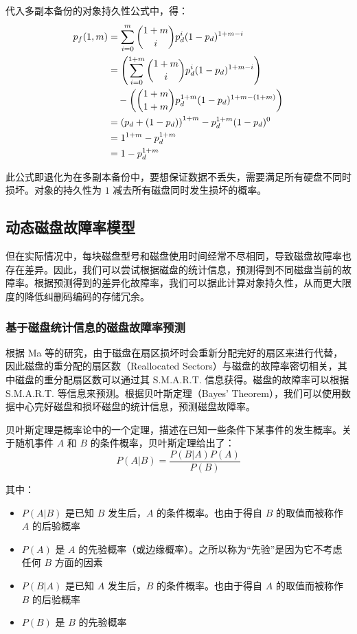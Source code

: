 代入多副本备份的对象持久性公式中，得：
\begin{equation}
\begin{split}
p_{f}(1,m)&=\sum_{i=0}^{m}{\dbinom{1+m}{i}p_{d}^{i}(1-p_d)^{1+m-i}}\\
&=\left(\sum_{i=0}^{1+m}{\dbinom{1+m}{i}p_{d}^{i}(1-p_d)^{1+m-i}}\right)\\
&\quad-\left(\dbinom{1+m}{1+m}p_{d}^{1+m}(1-p_d)^{1+m-(1+m)}\right)\\
&=\left(p_d+(1-p_d)\right)^{1+m}-p_{d}^{1+m}(1-p_d)^{0}\\
&=1^{1+m}-p_{d}^{1+m}\\
&=1-p_{d}^{1+m}
\end{split}
\end{equation}

此公式即退化为在多副本备份中，要想保证数据不丢失，需要满足所有硬盘不同时损坏。对象的持久性为 $1$ 减去所有磁盘同时发生损坏的概率。
\subsection{动态磁盘故障率模型}
但在实际情况中，每块磁盘型号和磁盘使用时间经常不尽相同，导致磁盘故障率也存在差异。因此，我们可以尝试根据磁盘的统计信息，预测得到不同磁盘当前的故障率。根据预测得到的差异化故障率，我们可以据此计算对象持久性，从而更大限度的降低纠删码编码的存储冗余。
\subsubsection{基于磁盘统计信息的磁盘故障率预测}
根据 Ma 等\cite{ma2015raidshield}的研究，由于磁盘在扇区损坏时会重新分配完好的扇区来进行代替，因此磁盘的重分配的扇区数（Reallocated Sectors）与磁盘的故障率密切相关，其中磁盘的重分配扇区数可以通过其 S.M.A.R.T. 信息\cite{allen2004monitoring}获得。磁盘的故障率可以根据 S.M.A.R.T. 等信息来预测\cite{xu2018improving,mahdisoltani2017proactive,lu2020making,dos2017predicting,chaves2018hard,botezatu2016predicting,anantharaman2018large}。根据贝叶斯定理（Bayes' Theorem），我们可以使用数据中心完好磁盘和损坏磁盘的统计信息，预测磁盘故障率。

贝叶斯定理是概率论中的一个定理，描述在已知一些条件下某事件的发生概率。关于随机事件 $A$ 和 $B$ 的条件概率，贝叶斯定理给出了：
\begin{equation}
P(A|B)=\dfrac{P(B|A)P(A)}{P(B)}
\end{equation}

其中：
\begin{itemize}
\item $P(A|B)$ 是已知 $B$ 发生后，$A$ 的条件概率。也由于得自 $B$ 的取值而被称作 $A$ 的后验概率
\item $P(A)$ 是 $A$ 的先验概率（或边缘概率）。之所以称为“先验”是因为它不考虑任何 $B$ 方面的因素
\item $P(B|A)$ 是已知 $A$ 发生后，$B$ 的条件概率。也由于得自 $A$ 的取值而被称作 $B$ 的后验概率
\item $P(B)$ 是 $B$ 的先验概率
\end{itemize}


